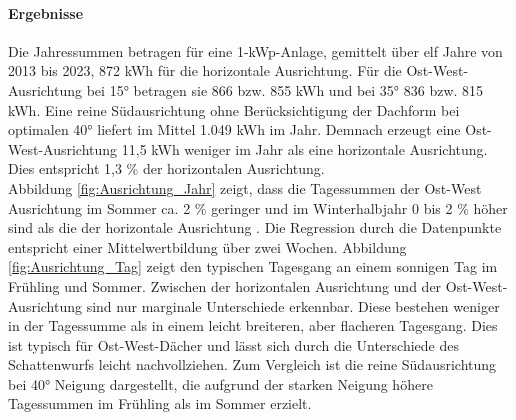 \paragraph{Ergebnisse}
Die Jahressummen betragen für eine 1-kWp-Anlage, gemittelt über elf Jahre von 2013 bis 2023, 872 kWh für die horizontale Ausrichtung.  Für die Ost-West-Ausrichtung bei 15° betragen sie 866 bzw. 855 kWh und bei 35° 836 bzw. 815 kWh. Eine reine Südausrichtung ohne Berücksichtigung der Dachform bei optimalen 40° liefert im Mittel 1.049 kWh im Jahr. Demnach erzeugt eine Ost-West-Ausrichtung 11,5 kWh weniger im Jahr als eine horizontale Ausrichtung. Dies entspricht 1,3 \% der horizontalen Ausrichtung. \\
Abbildung \ref{fig:Ausrichtung_Jahr} zeigt, dass die Tagessummen der Ost-West Ausrichtung im Sommer ca. 2 \% geringer und im Winterhalbjahr 0 bis 2 \% höher sind als die der horizontale Ausrichtung . Die Regression durch die Datenpunkte entspricht einer Mittelwertbildung über zwei Wochen.
Abbildung \ref{fig:Ausrichtung_Tag} zeigt den typischen Tagesgang an einem sonnigen Tag im Frühling und Sommer. Zwischen der horizontalen Ausrichtung und der Ost-West-Ausrichtung sind nur marginale Unterschiede erkennbar. Diese bestehen weniger in der Tagessumme als in einem leicht breiteren, aber flacheren Tagesgang. Dies ist typisch für Ost-West-Dächer und lässt sich durch die Unterschiede des Schattenwurfs leicht nachvollziehen. Zum Vergleich ist die reine Südausrichtung bei 40° Neigung dargestellt, die aufgrund der starken Neigung höhere Tagessummen im Frühling als im Sommer erzielt. 




